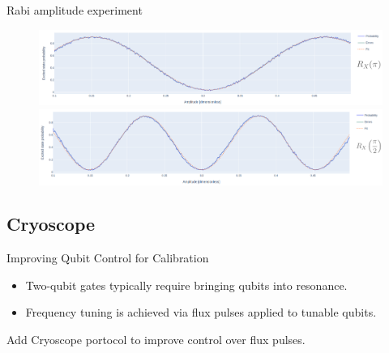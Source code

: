 \documentclass[aspectratio=169,10pt]{beamer}
\begin{document}
\begin{frame}{Rabi amplitude experiment}
    \begin{figure}
    \centering
    \includegraphics[width=\textwidth]{figures/B4.png}
    \vfill
    \includegraphics[width=\textwidth]{figures/B4_90.png}
  \end{figure}
\end{frame}


\subsection{Cryoscope}

\begin{frame}{Improving Qubit Control for Calibration}
  \begin{itemize}
    \item<2-> Two-qubit gates typically require bringing qubits into resonance.
    \item<3-> Frequency tuning is achieved via flux pulses applied to tunable qubits.
  \end{itemize}
  Add Cryoscope portocol to improve control over flux pulses.
\end{frame}
\end{document}
